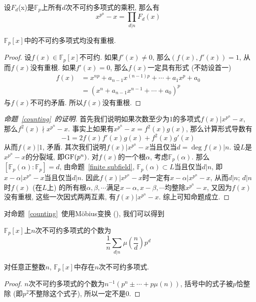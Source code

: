 \begin{prop}\label{counting}
    设$F_d$(x)是$\mathbb{F}_p$上所有$d$次不可约多项式的乘积, 那么有
    \[x^{p^n}-x=\prod_{d|n}F_d(x)\]
\end{prop}
\begin{lem}
    $\mathbb{F}_p[x]$中的不可约多项式均没有重根.
\end{lem}
\begin{proof}
    设$f(x)\in\mathbb{F}_p[x]$不可约.
    如果$f'(x)\neq 0$, 那么$(f(x),f'(x))=1$, 从而$f(x)$没有重根.
    如果$f'(x)=0$, 那么$f(x)$一定具有形式 (不妨设首一)
    \begin{align*}
        f(x)&=x^{np}+a_{n-1}x^{(n-1)p}+\cdots+a_1x^p+a_0\\
        &=(x^n+a_{n-1}x^{n-1}+\cdots+a_0)^p
    \end{align*}
    与$f(x)$不可约矛盾.
    所以$f(x)$没有重根.
\end{proof}
\begin{proof}[命题~\ref{counting}~的证明]
    首先我们说明如果次数至少为$1$的多项式$f(x)|x^{p^n}-x$, 那么$f^2(x)\nmid x^{p^n}-x$.
    事实上如果有$x^{p^n}-x=f^2(x)g(x)$, 那么计算形式导数有
    \[-1=2f(x)f'(x)g(x)+f^2(x)g'(x)\]
    从而$f(x)|1$, 矛盾.
    其次我们说明$f(x)|x^{p^n}-x$当且仅当$d=\deg{f(x)}|n$.
    设$L$是$x^{p^n}-x$的分裂域, 即$\operatorname{GF}(p^n)$.
    对$f(x)$的一个根$\alpha$, 考虑$\mathbb{F}_p(\alpha)$.
    那么$[\mathbb{F}_p(\alpha):\mathbb{F}_p]=d$, 由命题~\ref{finite subfield}, $\mathbb{F}_p(\alpha)\subset L$当且仅当$d|n$, 即$x-\alpha|x^{p^n}-x$当且仅当$d|n$.
    因此$f(x)|x^{p^n}-x$时一定有$x-\alpha|x^{p^n}-x$, 从而$d|n$;
    $d|n$时$f(x)$ (在$L$上) 的所有根$\alpha,\beta,\cdots$满足$x-\alpha,x-\beta,\cdots$均整除$x^{p^n}-x$, 又因为$f(x)$没有重根, 这些一次因式两两互素, 有$f(x)|x^{p^n}-x$.
    综上可知命题成立.
\end{proof}

对命题~\ref{counting}~使用M\"{o}bius变换 (\parencite[第2章定理2]{NT}), 我们可以得到
\begin{thm}
    $\mathbb{F}_p[x]$上$n$次不可约多项式的个数为
    \[\frac{1}{n}\sum_{d|n}\mu\left(\frac{n}{d}\right)p^d\]
\end{thm}

\begin{col}
    对任意正整数$n$, $\mathbb{F}_p[x]$中存在$n$次不可约多项式.
\end{col}
\begin{proof}
    $n$次不可约多项式的个数为$n^{-1}(p^n\pm\cdots+p\mu(n))$, 括号中的式子被$p$恰整除 (即$p^2$不整除这个式子), 所以一定不是$0$.
\end{proof}